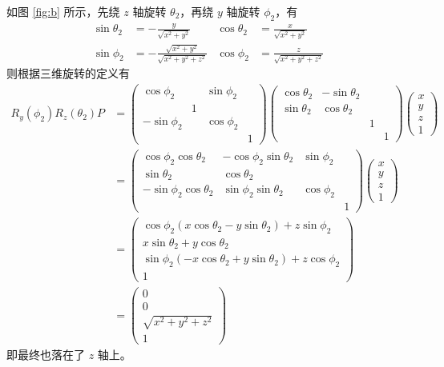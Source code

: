 \documentclass[math-font=newcm]{sjtuarticle}
\begin{document}
\begin{solution}
    如图 \ref{fig:b} 所示，先绕 $z$ 轴旋转 $\theta_2$，再绕 $y$ 轴旋转 $\phi_2$，有
    \begin{align}
        \sin\theta_2&=-\frac{y}{\sqrt{x^2+y^2}} & \cos\theta_2 &=\frac{x}{\sqrt{x^2+y^2}} \\
        \sin\phi_2&=-\frac{\sqrt{x^2+y^2}}{\sqrt{x^2+y^2+z^2}} & \cos\phi_2&=\frac{z}{\sqrt{x^2+y^2+z^2}}
    \end{align}
    则根据三维旋转的定义有
    \begin{align*}
        R_y(\phi_2)R_z(\theta_2)P&=\begin{pmatrix}
            \cos\phi_2 & & \sin\phi_2 & \\
            & 1 & \\
            -\sin\phi_2 & & \cos\phi_2 & \\
             & & & 1
        \end{pmatrix}\begin{pmatrix}
            \cos\theta_2 & -\sin\theta_2 \\
            \sin\theta_2 & \cos\theta_2 \\
            & & 1 \\
            & & & 1
        \end{pmatrix}\begin{pmatrix}
            x \\ y \\ z \\ 1
        \end{pmatrix}\\
        &=\begin{pmatrix}
            \cos\phi_2\cos\theta_2 & -\cos\phi_2\sin\theta_2 & \sin\phi_2 \\
            \sin\theta_2 & \cos\theta_2 & \\
            -\sin\phi_2\cos\theta_2 & \sin\phi_2\sin\theta_2 & \cos\phi_2 \\
            & & & 1
        \end{pmatrix}\begin{pmatrix}
            x \\ y \\ z \\ 1
        \end{pmatrix}\\
        &=\begin{pmatrix}
            \cos\phi_2(x\cos\theta_2-y\sin\theta_2)+z\sin\phi_2 \\
            x\sin\theta_2+y\cos\theta_2 \\
            \sin\phi_2(-x\cos\theta_2+y\sin\theta_2)+z\cos\phi_2 \\
            1
        \end{pmatrix}\\
        &=\begin{pmatrix}
            0 \\
            0 \\
            \sqrt{x^2+y^2+z^2}\\
            1
        \end{pmatrix}
    \end{align*}
    即最终也落在了 $z$ 轴上。
\end{solution}
\end{document}

